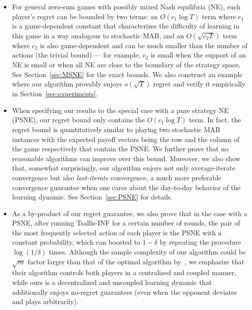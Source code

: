 \begin{itemize}[leftmargin=*]
\item For general zero-sum games with possibly mixed Nash equilibria (NE), each player's regret can be bounded by two terms: an $O(c_1\log T)$ term where $c_1$ is a game-dependent constant that characterizes the difficulty of learning in this game in a way analogous to stochastic MAB, and an $O(\sqrt{c_2 T})$ term where $c_2$ is also game-dependent and can be much smaller than the number of actions (the trivial bound)  --- for example, $c_2$ is small when the support of an NE is small or when all NE are close to the boundary of the strategy space.
See Section~\ref{sec:MSNE} for the exact bounds.
We also construct an example where our algorithm provably enjoys $o(\sqrt{T})$ regret and verify it empirically in Section~\ref{sec:experiments}.

\item When specifying our results to the special case with a pure strategy NE (PSNE), our regret bound only contains the $O(c_1 \log T)$ term. In fact, the regret bound is quantitatively similar to playing two stochastic MAB instances with the expected payoff vectors being the row and the column of the game respectively that contain the PSNE.
We further prove that no reasonable algorithms can improve over this bound.
Moreover, we also show that, somewhat surprisingly, our algorithm enjoys not only average-iterate convergence but also \emph{last-iterate} convergence, a much more preferable convergence guarantee when one cares about the day-to-day behavior of the learning dynamic.
See Section~\ref{sec:PSNE} for details.

\item As a by-product of our regret guarantee, we also prove that in the case with a PSNE, after running Tsallis-INF for a certain number of rounds, the pair of the most frequently selected action of each player is the PSNE with a constant probability, which can boosted to $1-\delta$ by repeating the procedure $\log(1/\delta)$ times.
Although the sample complexity of our algorithm could be $\sqrt{m}$ factor larger than that of the optimal algorithm by~\citet{maiti2024midsearch}, we emphasize that their algorithm controls both players in a centralized and coupled manner, while ours is a decentralized and uncoupled learning dynamic that additionally enjoys no-regret guarantees (even when the opponent deviates and plays arbitrarily).
\end{itemize}

